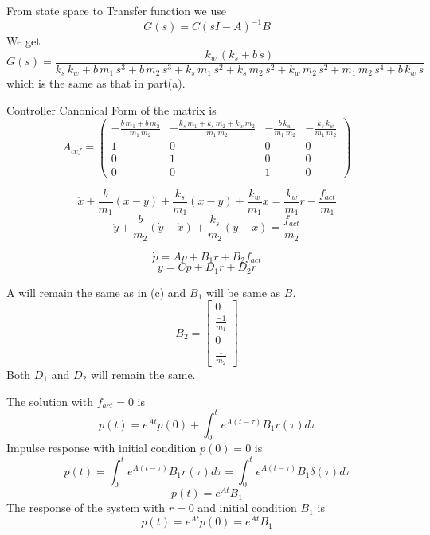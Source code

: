 \documentclass{article}
\newenvironment{answer}[2][Answer]{\begin{trivlist}
  \item[\hskip \labelsep {\bfseries #1}\hskip \labelsep {\bfseries #2:}]}{\end{trivlist}}
\begin{document}
\begin{answer}c
  From state space to Transfer function we use
  $$G(s) = C(sI - A)^{-1}B$$
  We get
  $$G(s) = \frac{k_{w}\, \left(k_{s} + b\, s\right)}{k_{s}\, k_{w} + b\, m_{1}\, s^3 + b\, m_{2}\, s^3 + k_{s}\, m_{1}\, s^2 + k_{s}\, m_{2}\, s^2 + k_{w}\, m_{2}\, s^2 + m_{1}\, m_{2}\, s^4 + b\, k_{w}\, s}$$
  which is the same as that in part(a).

\end{answer}

\begin{answer}d
  Controller Canonical Form of the matrix is
  $$A_{ccf} = \left(\begin{array}{cccc} -\frac{b\, m_{1} + b\, m_{2}}{m_{1}\, m_{2}} & -\frac{k_{s}\, m_{1} + k_{s}\, m_{2} + k_{w}\, m_{2}}{m_{1}\, m_{2}} & -\frac{b\, k_{w}}{m_{1}\, m_{2}} & -\frac{k_{s}\, k_{w}}{m_{1}\, m_{2}}\\ 1 & 0 & 0 & 0\\ 0 & 1 & 0 & 0\\ 0 & 0 & 1 & 0 \end{array}\right)$$
\end{answer}

\begin{answer}e
  \begin{equation}
    \label{eq:3}
    \ddot{x} + \frac{b}{m_1}(\dot{x} - \dot{y}) + \frac{k_s}{m_1}(x - y) + \frac{k_w}{m_1}x = \frac{k_w}{m_1}r - \frac{f_{act}}{m_1}
  \end{equation}
  \begin{equation}
    \label{eq:4}
    \ddot{y} + \frac{b}{m_2}(\dot{y} - \dot{x}) + \frac{k_s}{m_2}(y - x) = \frac{f_{act}}{m_2}
  \end{equation}

\end{answer}
\begin{answer}f
  $$\dot{p} = Ap + B_1r + B_2f_{act}$$
  $$ y = Cp + D_1r + D_2r$$

  A will remain the same as in (c) and $B_1$ will be same as $B$.
  \[
    B_2 =
    \begin{bmatrix}
      0\\
      \frac{-1}{m_1}\\
      0\\
      \frac{1}{m_2}
      
    \end{bmatrix}
  \]
  Both $D_1$ and $D_2$ will remain the same.  
\end{answer}
\begin{answer}g
  The solution with $f_{act} = 0$ is
  $$p(t) = e^{At}p(0) + \int_0^t e^{A(t-\tau)}B_1r(\tau)d\tau$$
  Impulse response with initial condition $p(0) = 0$ is
  $$p(t) = \int_0^t e^{A(t-\tau)}B_1r(\tau)d\tau = \int_0^t e^{A(t-\tau)}B_1\delta(\tau)d\tau$$
  $$p(t) = e^{At}B_1$$
  The response of the system with $r = 0$ and initial condition $B_1$ is
  $$p(t) = e^{At}p(0) = e^{At}B_1$$
  
\end{answer}
\begin{answer}h
  
\end{answer}
\end{document}
